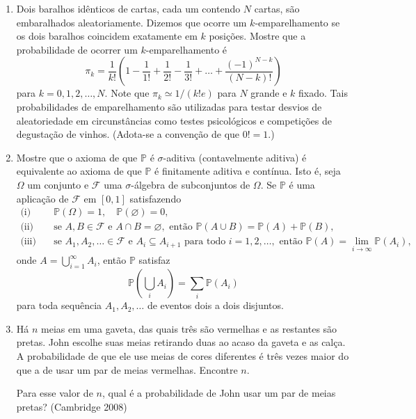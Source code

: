 \documentclass[12pt,portuguese]{article}
\theoremstyle{definition}
\begin{document}
\begin{enumerate}[label={\arabic*.}]
\begin{enumerate}[label=(\alph*), ref=\alph*]
Você pode assumir que, para \(x \in \mathbb{R}\),
\[
e^x = \sum_{r=0}^{\infty} \frac{x^r}{r!} = \lim_{N \to
\infty} \left(1 + \frac{x}{N}\right)^N.
\]
\end{enumerate}
(Oxford 1978M)
\item Dois baralhos idênticos de cartas, cada um contendo \(N\) cartas, são
embaralhados aleatoriamente. Dizemos que ocorre um \(k\)-emparelhamento
se os dois baralhos coincidem exatamente em \(k\) posições. Mostre que a
probabilidade de ocorrer um \(k\)-emparelhamento é
\[
\pi_k = \frac{1}{k!} \left(1 - \frac{1}{1!} + \frac{1}{2!} -
\frac{1}{3!} + \dots + \frac{(-1)^{N-k}}{(N-k)!}\right)
\]
para \(k = 0, 1, 2, \dots, N\). Note que \(\pi_k \simeq
1/(k!e)\) para \(N\) grande e \(k\) fixado. Tais probabilidades de
emparelhamento são utilizadas para testar desvios de aleatoriedade em
circunstâncias como testes psicológicos e competições de degustação de
vinhos. (Adota-se a convenção de que \(0! = 1\).)
\item[\starredproblem] Mostre que o axioma de que \(\mathbb{P}\) é
$\sigma$-aditiva (contavelmente aditiva) é equivalente ao axioma de que
\(\mathbb{P}\) é finitamente aditiva e contínua. Isto é, seja \(\Omega\)
um conjunto e \(\mathcal{F}\) uma $\sigma$-álgebra de subconjuntos de
\(\Omega\). Se \(\mathbb{P}\) é uma aplicação de \(\mathcal{F}\) em
\([0, 1]\) satisfazendo
\[
\begin{aligned}
\text{(i)} &\quad \mathbb{P}(\Omega) = 1, \quad \mathbb{P}(\varnothing)
= 0, \\
\text{(ii)} &\quad \text{se } A, B \in \mathcal{F} \text{ e }
A \cap B = \varnothing, \text{ então } \mathbb{P}(A \cup B) =
\mathbb{P}(A) + \mathbb{P}(B), \\
\text{(iii)} &\quad \text{se } A_1, A_2, \dots \in
\mathcal{F} \text{ e } A_i \subseteq A_{i+1} \text{ para todo }
i = 1, 2, \dots, \text{ então } \mathbb{P}(A) = \lim_{i \to
\infty} \mathbb{P}(A_i),
\end{aligned}
\]
onde \(A = \bigcup_{i=1}^{\infty} A_i\), então \(\mathbb{P}\)
satisfaz
\[
\mathbb{P}\left(\bigcup_i A_i\right) = \sum_i \mathbb{P}(A_i)
\]
para toda sequência \(A_1, A_2, \dots\) de eventos dois a dois
disjuntos.
\item Há \(n\) meias em uma gaveta, das quais três são vermelhas e as
restantes são pretas. John escolhe suas meias retirando duas ao acaso da
gaveta e as calça. A probabilidade de que ele use meias de cores
diferentes é três vezes maior do que a de usar um par de meias
vermelhas. Encontre \(n\).

Para esse valor de \(n\), qual é a probabilidade de John usar um par de
meias pretas? (Cambridge 2008)
\end{enumerate}




  
\end{document}
